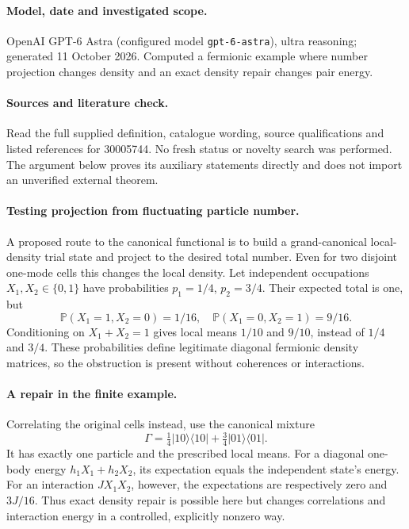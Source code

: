 \documentclass[11pt]{article}
\begin{document}
\paragraph{Model, date and investigated scope.}
OpenAI GPT-6 Astra (configured model \texttt{gpt-6-astra}), ultra reasoning; generated 11 October 2026. Computed a fermionic example where number projection changes density and an exact density repair changes pair energy.

\paragraph{Sources and literature check.}
Read the full supplied definition, catalogue wording, source qualifications and listed references for 30005744. No fresh status or novelty search was performed. The argument below proves its auxiliary statements directly and does not import an unverified external theorem.

\paragraph{Testing projection from fluctuating particle number.} A proposed route to the canonical functional is to build a grand-canonical local-density trial state and project to the desired total number. Even for two disjoint one-mode cells this changes the local density. Let independent occupations \(X_1,X_2\in\{0,1\}\) have probabilities \(p_1=1/4\), \(p_2=3/4\). Their expected total is one, but
\[
 \mathbb P(X_1=1,X_2=0)=1/16,\quad
 \mathbb P(X_1=0,X_2=1)=9/16.
\]
Conditioning on \(X_1+X_2=1\) gives local means \(1/10\) and \(9/10\), instead of \(1/4\) and \(3/4\). These probabilities define legitimate diagonal fermionic density matrices, so the obstruction is present without coherences or interactions.
\paragraph{A repair in the finite example.} Correlating the original cells instead, use the canonical mixture
\[
 \Gamma=\tfrac14|10\rangle\langle10|+\tfrac34|01\rangle\langle01|.
\]
It has exactly one particle and the prescribed local means. For a diagonal one-body energy \(h_1X_1+h_2X_2\), its expectation equals the independent state's energy. For an interaction \(JX_1X_2\), however, the expectations are respectively zero and \(3J/16\). Thus exact density repair is possible here but changes correlations and interaction energy in a controlled, explicitly nonzero way.
\end{document}
